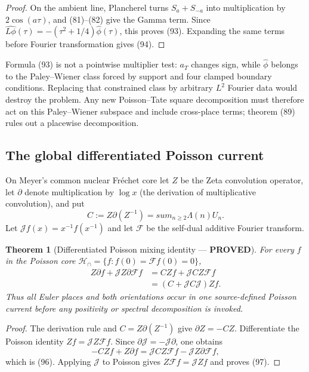 \documentclass[11pt]{article}
\newtheorem{theorem}{Theorem}
\newcommand{\PROVED}{\textcolor{green!45!black}{\textbf{PROVED}}}
\begin{document}
\begin{proof}
On the ambient line, Plancherel turns $S_a+S_{-a}$ into multiplication by
$2\cos(a\tau)$, and (81)--(82) give the Gamma term.  Since
$\widehat{L\phi}(\tau)=-(\tau^2+1/4)\widehat\phi(\tau)$, this proves (93).
Expanding the same terms before Fourier transformation gives (94).
\end{proof}

Formula (93) is not a pointwise multiplier test: $a_T$ changes sign, while
$\widehat\phi$ belongs to the Paley--Wiener class forced by support and four
clamped boundary conditions.  Replacing that constrained class by arbitrary
$L^2$ Fourier data would destroy the problem.  Any new Poisson--Tate square
decomposition must therefore act on this Paley--Wiener subspace and include
cross-place terms; theorem (89) rules out a placewise decomposition.

\subsection{The global differentiated Poisson current}

On Meyer's common nuclear Fr\'echet core let $Z$ be the Zeta convolution
operator, let $\partial$ denote multiplication by $\log x$ (the derivation of
multiplicative convolution), and put
\begin{equation}
 C:=Z\partial(Z^{-1})=sum_{n\ge2}\Lambda(n)U_n.       \tag{95}
\end{equation}
Let $\mathscr Jf(x)=x^{-1}f(x^{-1})$ and let $\mathcal F$ be the self-dual
additive Fourier transform.

\begin{theorem}[Differentiated Poisson mixing identity --- \PROVED]
For every $f$ in the Poisson core
$\mathcal H_\cap=\{f:f(0)=\mathcal Ff(0)=0\}$,
\begin{align}
 Z\partial f+\mathscr JZ\partial\mathcal Ff
 &=CZf+\mathscr JCZ\mathcal Ff                         \tag{96}\\
 &=(C+\mathscr JC\mathscr J)Zf.                        \tag{97}
\end{align}
Thus all Euler places and both orientations occur in one source-defined
Poisson current before any positivity or spectral decomposition is invoked.
\end{theorem}

\begin{proof}
The derivation rule and $C=Z\partial(Z^{-1})$ give
$\partial Z=-CZ$.  Differentiate the Poisson identity
$Zf=\mathscr JZ\mathcal Ff$.  Since
$\partial\mathscr J=-\mathscr J\partial$, one obtains
\[
 -CZf+Z\partial f
 =\mathscr JCZ\mathcal Ff-\mathscr JZ\partial\mathcal Ff,
\]
which is (96).  Applying $\mathscr J$ to Poisson gives
$Z\mathcal Ff=\mathscr JZf$ and proves (97).
\end{proof}
\end{document}
